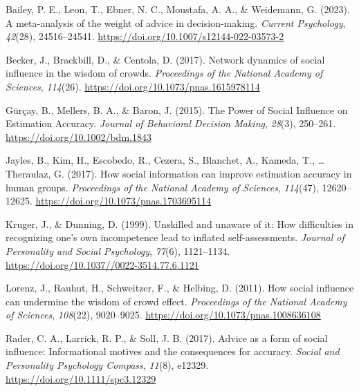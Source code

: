 \documentclass[
  man,floatsintext]{apa6}
\newlength{\cslhangindent}
\newlength{\cslentryspacingunit} %
\newenvironment{CSLReferences}[2] %
 {%
  \setlength{\parindent}{0pt}
  \ifodd #1
  \let\oldpar\par
  \def\par{\hangindent=\cslhangindent\oldpar}
  \fi
  \setlength{\parskip}{#2\cslentryspacingunit}
 }%
 {}
\begin{document}
\hypertarget{refs}{}
\begin{CSLReferences}{1}{0}
\leavevmode{}%
Bailey, P. E., Leon, T., Ebner, N. C., Moustafa, A. A., \& Weidemann, G. (2023). A meta-analysis of the weight of advice in decision-making. \emph{Current Psychology}, \emph{42}(28), 24516--24541. \url{https://doi.org/10.1007/s12144-022-03573-2}

\leavevmode{}%
Becker, J., Brackbill, D., \& Centola, D. (2017). Network dynamics of social influence in the wisdom of crowds. \emph{Proceedings of the National Academy of Sciences}, \emph{114}(26). \url{https://doi.org/10.1073/pnas.1615978114}

\leavevmode{}%
Gürçay, B., Mellers, B. A., \& Baron, J. (2015). The {Power} of {Social Influence} on {Estimation Accuracy}. \emph{Journal of Behavioral Decision Making}, \emph{28}(3), 250--261. \url{https://doi.org/10.1002/bdm.1843}

\leavevmode{}%
Jayles, B., Kim, H., Escobedo, R., Cezera, S., Blanchet, A., Kameda, T., \ldots{} Theraulaz, G. (2017). How social information can improve estimation accuracy in human groups. \emph{Proceedings of the National Academy of Sciences}, \emph{114}(47), 12620--12625. \url{https://doi.org/10.1073/pnas.1703695114}

\leavevmode{}%
Kruger, J., \& Dunning, D. (1999). Unskilled and unaware of it: How difficulties in recognizing one's own incompetence lead to inflated self-assessments. \emph{Journal of Personality and Social Psychology}, \emph{77}(6), 1121--1134. \url{https://doi.org/10.1037//0022-3514.77.6.1121}

\leavevmode{}%
Lorenz, J., Rauhut, H., Schweitzer, F., \& Helbing, D. (2011). How social influence can undermine the wisdom of crowd effect. \emph{Proceedings of the National Academy of Sciences}, \emph{108}(22), 9020--9025. \url{https://doi.org/10.1073/pnas.1008636108}

\leavevmode{}%
Rader, C. A., Larrick, R. P., \& Soll, J. B. (2017). Advice as a form of social influence: {Informational} motives and the consequences for accuracy. \emph{Social and Personality Psychology Compass}, \emph{11}(8), e12329. \url{https://doi.org/10.1111/spc3.12329}


\end{CSLReferences}
\end{document}
